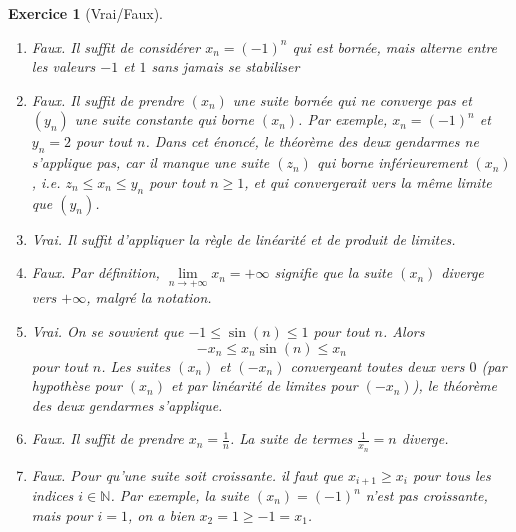 \documentclass[11.5pt,french,table]{article}
\newcommand{\enumeratelinefix}{\leavevmode \vspace{-\baselineskip}} %
\theoremstyle{exercice}
\newtheorem{exercice}{Exercice}
\begin{document}
\begin{exercice}[Vrai/Faux]
\enumeratelinefix
\begin{enumerate}
    \item Faux. Il suffit de considérer $x_n = (-1)^n$ qui est bornée, mais alterne entre les valeurs $-1$ et $1$ sans jamais se stabiliser
    \item Faux. Il suffit de prendre $(x_n)$ une suite bornée qui ne converge pas et $(y_n)$ une suite constante qui borne $(x_n)$. Par exemple, $x_n = (-1)^n$ et $y_n = 2$ pour tout $n$. Dans cet énoncé, le théorème des deux gendarmes ne s'applique pas, car il manque une suite $(z_n)$ qui borne inférieurement $(x_n)$, i.e. $z_n \leq x_n \leq y_n$ pour tout $n \geq 1$, et qui convergerait vers la même limite que $(y_n)$.
    \item Vrai. Il suffit d'appliquer la règle de linéarité et de produit de limites.
    \item Faux. Par définition, $\lim \limits_{n \to +\infty} x_n = +\infty$ signifie que la suite $(x_n)$ diverge vers $+\infty$, malgré la notation.
    \item Vrai. On se souvient que $-1 \leq \sin(n) \leq 1$ pour tout $n$. Alors
    $$- x_n \leq x_n \sin(n) \leq x_n$$
    pour tout $n$. Les suites $(x_n)$ et $(-x_n)$ convergeant toutes deux vers $0$ (par hypothèse pour $(x_n)$ et par linéarité de limites pour $(-x_n)$), le théorème des deux gendarmes s'applique.
    \item Faux. Il suffit de prendre $x_n = \frac{1}{n}$. La suite de termes $\frac{1}{x_n} = n$ diverge.
    \item Faux. Pour qu'une suite soit croissante. il faut que $x_{i+1} \geq x_i$ pour tous les indices $i \in \mathbb N$. Par exemple, la suite $(x_n) = (-1)^n$ n'est pas croissante, mais pour $i = 1$, on a bien $x_2 = 1 \geq -1 = x_1$.
\end{enumerate}
\end{exercice}
\end{document}
